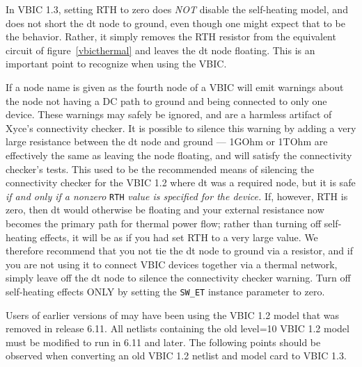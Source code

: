 In VBIC 1.3, setting RTH to zero does {\em NOT\/} disable the
self-heating model, and does not short the dt node to ground, even
though one might expect that to be the behavior.  Rather, it simply
removes the RTH resistor from the equivalent circuit of
figure~\ref{vbicthermal} and leaves the dt node floating.  This is an
important point to recognize when using the VBIC.

If a node name is given as the fourth node of a VBIC \Xyce{} will emit
warnings about the node not having a DC path to ground and being
connected to only one device.  These warnings may safely be ignored,
and are a harmless artifact of Xyce's connectivity checker.  It is
possible to silence this warning by adding a very large resistance
between the dt node and ground --- 1GOhm or 1TOhm are effectively the
same as leaving the node floating, and will satisfy the connectivity
checker's tests.  This used to be the recommended means of silencing
the connectivity checker for the VBIC 1.2 where dt was a required
node, but it is safe {\em if and only if a nonzero\/} \texttt{RTH}
{\em value is specified for the device.}  If, however, RTH is zero,
then dt would otherwise be floating and your external resistance now
becomes the primary path for thermal power flow; rather than turning
off self-heating effects, it will be as if you had set RTH to a very
large value.  We therefore recommend that you not tie the dt node to
ground via a resistor, and if you are not using it to connect VBIC
devices together via a thermal network, simply leave off the dt node
to silence the connectivity checker warning.  Turn off self-heating
effects ONLY by setting the \texttt{SW\_ET} instance parameter to zero.

Users of earlier versions of \Xyce{} may have been using the VBIC 1.2
model that was removed in release 6.11.  All netlists containing the
old level=10 VBIC 1.2 model must be modified to run in \Xyce{} 6.11
and later.  The following points should be observed when converting an
old VBIC 1.2 netlist and model card to VBIC 1.3.

